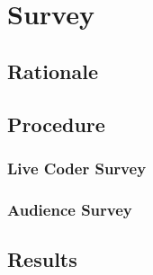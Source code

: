 
\chapter{Survey}
\label{cha:survey}

\section{Rationale}
\label{sec:surveyrationale}

\section{Procedure}
\label{sec:surveyprocedure}

\subsection{Live Coder Survey}
\label{sec:surveylivecoder}

\subsection{Audience Survey}
\label{sec:surveyaudience}

\section{Results}

